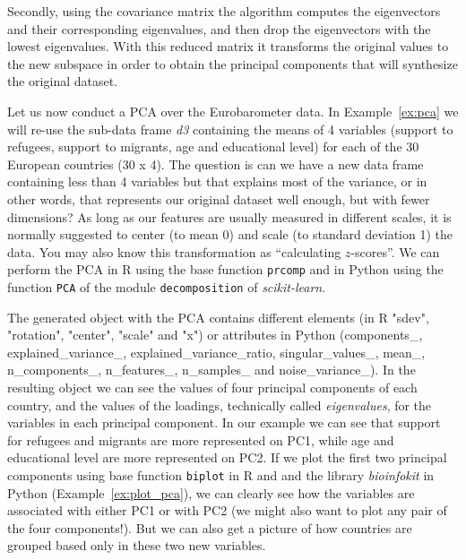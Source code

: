 Secondly, using the covariance matrix the algorithm computes the eigenvectors and their corresponding eigenvalues, and then drop the eigenvectors with the lowest eigenvalues. With this reduced matrix it transforms the original values to the new subspace in order to obtain the principal components that will synthesize the original dataset.

Let us now conduct a PCA over the Eurobarometer data.  In Example~\ref{ex:pca} we will re-use the sub-data frame \emph{d3} containing the means of 4 variables (support to refugees, support to migrants, age and educational level) for each of the 30 European countries (30 x 4). The question is  can we have a new data frame containing less than 4 variables but that explains most of the variance, or in other words, that represents our original dataset well enough, but with fewer dimensions? As long as our features are usually measured in different scales, it is normally suggested to center (to mean 0) and scale (to standard deviation 1) the data. You may also know this transformation as ``calculating $z$-scores''. We can perform the PCA in R using the base function \texttt{prcomp} and in Python using the function \texttt{PCA} of the module \texttt{decomposition} of \emph{scikit-learn}.


The generated object with the PCA contains different elements (in R "sdev",     "rotation", "center",  "scale" and   "x") or attributes in Python (components\_, explained\_variance\_, explained\_variance\_ratio, singular\_values\_, mean\_, n\_components\_, n\_features\_, n\_samples\_ and noise\_variance\_). In the resulting object we can see the values of four principal components of each country, and the values of the loadings, technically called \textit{eigenvalues}, for the variables in each principal component.  In our example we can see that support for refugees and migrants are more represented on PC1, while age and educational level are more represented on PC2. If we plot the first two principal components using base function \texttt{biplot} in R and and the library \emph{bioinfokit} in Python (Example~\ref{ex:plot_pca}), we can clearly see how the variables are associated with either PC1 or with PC2 (we might also want to plot any pair of the four components!). But we can also get a picture of how countries are grouped based only in these two new variables.

